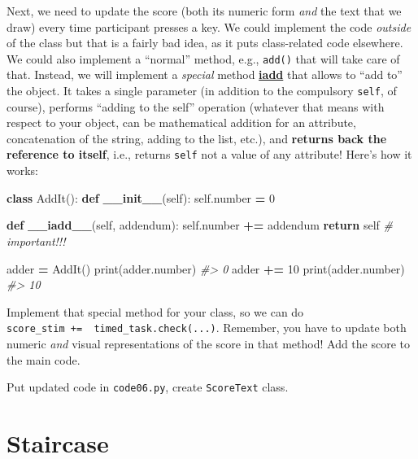\documentclass[
]{book}
\newenvironment{Shaded}{\begin{snugshade}}{\end{snugshade}}
\newcommand{\BuiltInTok}[1]{#1}
\newcommand{\CommentTok}[1]{\textcolor[rgb]{0.56,0.35,0.01}{\textit{#1}}}
\newcommand{\ControlFlowTok}[1]{\textcolor[rgb]{0.13,0.29,0.53}{\textbf{#1}}}
\newcommand{\DecValTok}[1]{\textcolor[rgb]{0.00,0.00,0.81}{#1}}
\newcommand{\FunctionTok}[1]{\textcolor[rgb]{0.13,0.29,0.53}{\textbf{#1}}}
\newcommand{\KeywordTok}[1]{\textcolor[rgb]{0.13,0.29,0.53}{\textbf{#1}}}
\newcommand{\NormalTok}[1]{#1}
\newcommand{\OperatorTok}[1]{\textcolor[rgb]{0.81,0.36,0.00}{\textbf{#1}}}
\newcommand{\VariableTok}[1]{\textcolor[rgb]{0.00,0.00,0.00}{#1}}
\begin{document}
Next, we need to update the score (both its numeric form \emph{and} the text that we draw) every time participant presses a key. We could implement the code \emph{outside} of the class but that is a fairly bad idea, as it puts class-related code elsewhere. We could also implement a ``normal'' method, e.g., \texttt{add()} that will take care of that. Instead, we will implement a \emph{special} method \href{https://docs.python.org/3/reference/datamodel.html\#object.__iadd__}{\textbf{iadd}} that allows to ``add to'' the object. It takes a single parameter (in addition to the compulsory \texttt{self}, of course), performs ``adding to the self'' operation (whatever that means with respect to your object, can be mathematical addition for an attribute, concatenation of the string, adding to the list, etc.), and \textbf{returns back the reference to itself}, i.e., returns \texttt{self} not a value of any attribute! Here's how it works:

\begin{Shaded}
\begin{Highlighting}[]
\KeywordTok{class}\NormalTok{ AddIt():}
    \KeywordTok{def} \FunctionTok{\_\_init\_\_}\NormalTok{(}\VariableTok{self}\NormalTok{):}
        \VariableTok{self}\NormalTok{.number }\OperatorTok{=} \DecValTok{0}
        
    \KeywordTok{def} \FunctionTok{\_\_iadd\_\_}\NormalTok{(}\VariableTok{self}\NormalTok{, addendum):}
        \VariableTok{self}\NormalTok{.number }\OperatorTok{+=}\NormalTok{ addendum}
        \ControlFlowTok{return} \VariableTok{self} \CommentTok{\# important!!!}


\NormalTok{adder }\OperatorTok{=}\NormalTok{ AddIt()}
\BuiltInTok{print}\NormalTok{(adder.number)}
\CommentTok{\#\textgreater{} 0}
\NormalTok{adder }\OperatorTok{+=} \DecValTok{10}
\BuiltInTok{print}\NormalTok{(adder.number)}
\CommentTok{\#\textgreater{} 10}
\end{Highlighting}
\end{Shaded}

Implement that special method for your class, so we can do \texttt{score\_stim\ +=\ \ timed\_task.check(...)}. Remember, you have to update both numeric \emph{and} visual representations of the score in that method! Add the score to the main code.

Put updated code in \texttt{code06.py}, create \texttt{ScoreText} class.

\hypertarget{staircase}{%
\section{Staircase}\label{staircase}}
\end{document}
